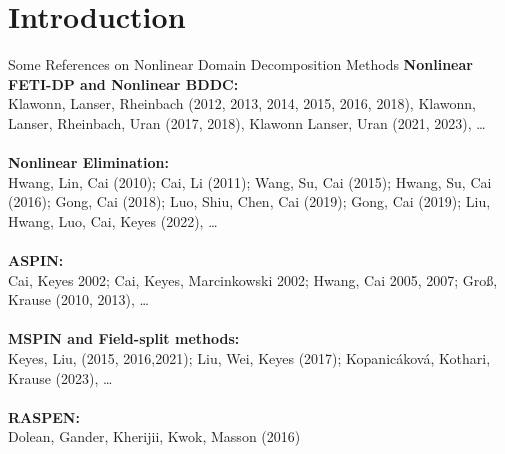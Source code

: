 \section{Introduction}

% 		

\begin{frame}{Some References on Nonlinear Domain Decomposition Methods}
	\tiny
	\textbf{Nonlinear FETI-DP and Nonlinear BDDC:}\\
	Klawonn, Lanser, Rheinbach (2012, 2013, 2014, 2015, 2016, 2018), Klawonn, Lanser, Rheinbach, Uran (2017, 2018), Klawonn Lanser, Uran (2021, 2023), \dots\\~\\

	\textbf{Nonlinear Elimination:}\\
	Hwang, Lin, Cai (2010); Cai, Li (2011); Wang, Su, Cai (2015); Hwang, Su, Cai (2016); Gong, Cai (2018); Luo, Shiu, Chen, Cai (2019); Gong, Cai (2019); Liu, Hwang, Luo, Cai, Keyes (2022), \dots\\~\\

	\textbf{ASPIN:}\\
	Cai, Keyes 2002; Cai, Keyes, Marcinkowski 2002; Hwang, Cai 2005, 2007; Groß, Krause (2010, 2013), \dots\\~\\

	\textbf{MSPIN and Field-split methods:}\\
	Keyes, Liu, (2015, 2016,2021); Liu, Wei, Keyes (2017); Kopanicáková, Kothari, Krause (2023), \dots\\~\\

	\textbf{RASPEN:}\\
	Dolean, Gander, Kherijii, Kwok, Masson (2016)\\~\\

    \hspace*{-2.7mm}
    \noindent{}\\~\\


\end{frame}
